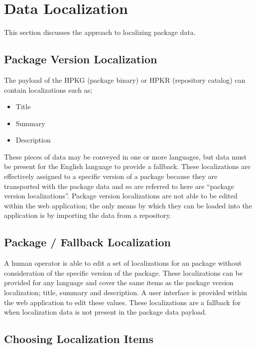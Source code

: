 
\section{Data Localization}
\label{datalocalization}

This section discusses the approach to localizing package data.

\subsection{Package Version Localization}

The payload of the HPKG (package binary) or HPKR (repository catalog) can contain localizations such as;

\begin{itemize}
\item Title
\item Summary
\item Description
\end{itemize}

These pieces of data may be conveyed in one or more languages, but data must be present for the English language to provide a fallback.  These localizations are effectively assigned to a specific version of a package because they are transported with the package data and so are referred to here are ``package version localizations''.  Package version localizations are not able to be edited within the web application; the only means by which they can be loaded into the application is by importing the data from a repository.

\subsection{Package / Fallback Localization}

A human operator is able to edit a set of localizations for an package without consideration of the specific version of the package.  These localizations can be provided for any language and cover the same items as the package version localization; title, summary and description.  A user interface is provided within the web application to edit these values.  These localizations are a fallback for when localization data is not present in the package data payload.

\subsection{Choosing Localization Items}

